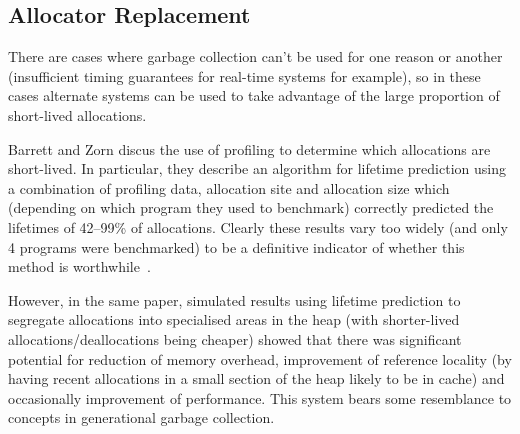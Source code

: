 \subsection{Allocator Replacement}

There are cases where garbage collection can't be used for one reason or another (insufficient timing guarantees for real-time systems for example), so in these cases alternate systems can be used to take advantage of the large proportion of short-lived allocations.

Barrett and Zorn discus the use of profiling to determine which allocations are short-lived. In particular, they describe an algorithm for lifetime prediction using a combination of profiling data, allocation site and allocation size which (depending on which program they used to benchmark) correctly predicted the lifetimes of 42–99\% of allocations. Clearly these results vary too widely (and only 4 programs were benchmarked) to be a definitive indicator of whether this method is worthwhile~\cite{predictors}.

However, in the same paper, simulated results using lifetime prediction to segregate allocations into specialised areas in the heap (with shorter-lived allocations/deallocations being cheaper) showed that there was significant potential for reduction of memory overhead, improvement of reference locality (by having recent allocations in a small section of the heap likely to be in cache) and occasionally improvement of performance. This system bears some resemblance to concepts in generational garbage collection.
